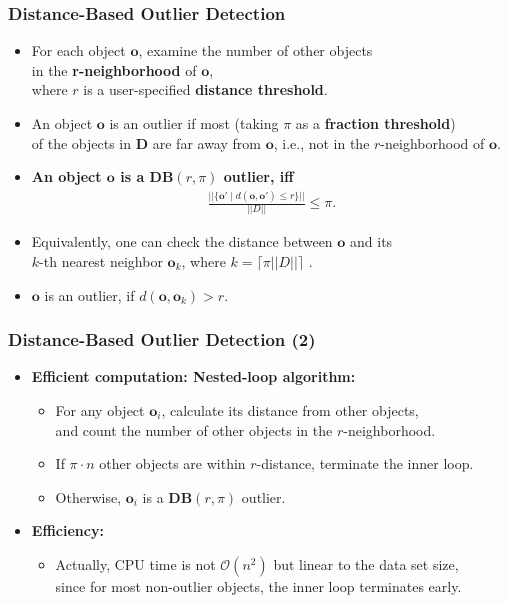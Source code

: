\begin{frame}
	\frametitle{Distance-Based Outlier Detection }
	\begin{itemize}
		\item For each object $\mathbf{o}$, examine the number of other objects \\
		      in the \textbf{r-neighborhood} of $\mathbf{o}$, \\
		      where $r$ is a user-specified \textbf{distance threshold}.
		\item An object $\mathbf{o}$ is an outlier if most (taking $\pi$ as a \textbf{fraction threshold}) \\
		      of the objects in $\mathbf{D}$ are far away from $\mathbf{o}$, i.e., not in the $r$-neighborhood of $\mathbf{o}$.
	\end{itemize}
	\begin{itemize}
		\item \textbf{An object $\mathbf{o}$ is a $\mathbf{DB}(r, \pi)$ outlier, iff}
		      \begin{align}
			      \frac{||\{\mathbf{o'} \; \vert \; d(\mathbf{o},\mathbf{o'}) \leq r \}|| }{||D||} \leq \pi.
		      \end{align}
		\item Equivalently, one can check the distance between $\mathbf{o}$ and its \\
		      $k$-th nearest neighbor $\mathbf{o}_k$, where $k=\lceil \pi ||D||\rceil$                       . \\
		\item $\mathbf{o}$ is an outlier, if $d(\mathbf{o}, \mathbf{o}_k) > r$.
	\end{itemize}
\end{frame}


\begin{frame}
	\frametitle{Distance-Based Outlier Detection (2)}
	\begin{itemize}
		\item \textbf{Efficient computation: {\color{airforceblue}Nested-loop algorithm}:}
		      \begin{itemize}
			      \item For any object $\mathbf{o}_i$, calculate its distance from other objects, \\
			            and count the number of other objects in the $r$-neighborhood.
			      \item If $\pi \cdot n$ other objects are within $r$-distance, terminate the inner loop.
			      \item Otherwise, $\mathbf{o}_i$ is a $\mathbf{DB}(r, \pi)$ outlier.
		      \end{itemize}
		\item \textbf{Efficiency:}
		      \begin{itemize}
			      \item Actually, CPU time is not $\mathcal{O}(n^2)$ but linear to the data set size,\\
			            since for most non-outlier objects, the inner loop terminates early.
		      \end{itemize}
	\end{itemize}
\end{frame}


